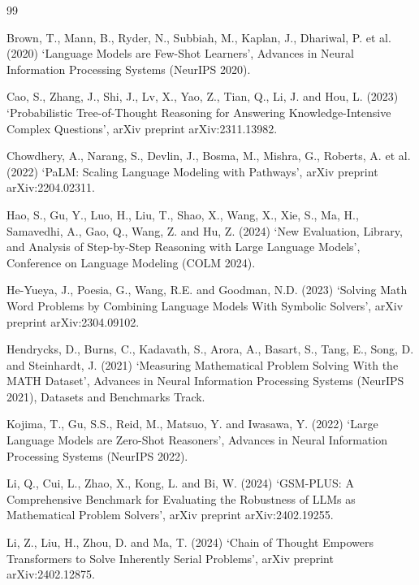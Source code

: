 \documentclass[a4paper,11pt,twoside]{report}
\begin{document}
\newpage
\renewcommand{\bibname}{References}
\begin{thebibliography}{99}

Brown, T., Mann, B., Ryder, N., Subbiah, M., Kaplan, J., Dhariwal, P. et
al. (2020) `Language Models are Few-Shot Learners', Advances in Neural
Information Processing Systems (NeurIPS 2020).

Cao, S., Zhang, J., Shi, J., Lv, X., Yao, Z., Tian, Q., Li, J. and Hou,
L. (2023) `Probabilistic Tree-of-Thought Reasoning for Answering
Knowledge-Intensive Complex Questions', arXiv preprint arXiv:2311.13982.

Chowdhery, A., Narang, S., Devlin, J., Bosma, M., Mishra, G., Roberts,
A. et al. (2022) `PaLM: Scaling Language Modeling with Pathways', arXiv
preprint arXiv:2204.02311.

Hao, S., Gu, Y., Luo, H., Liu, T., Shao, X., Wang, X., Xie, S., Ma, H.,
Samavedhi, A., Gao, Q., Wang, Z. and Hu, Z. (2024) `New Evaluation,
Library, and Analysis of Step-by-Step Reasoning with Large Language
Models', Conference on Language Modeling (COLM 2024).

He-Yueya, J., Poesia, G., Wang, R.E. and Goodman, N.D. (2023) `Solving
Math Word Problems by Combining Language Models With Symbolic Solvers',
arXiv preprint arXiv:2304.09102.

Hendrycks, D., Burns, C., Kadavath, S., Arora, A., Basart, S., Tang, E.,
Song, D. and Steinhardt, J. (2021) `Measuring Mathematical Problem
Solving With the MATH Dataset', Advances in Neural Information
Processing Systems (NeurIPS 2021), Datasets and Benchmarks Track.

Kojima, T., Gu, S.S., Reid, M., Matsuo, Y. and Iwasawa, Y. (2022) `Large
Language Models are Zero-Shot Reasoners', Advances in Neural Information
Processing Systems (NeurIPS 2022).

Li, Q., Cui, L., Zhao, X., Kong, L. and Bi, W. (2024) `GSM-PLUS: A
Comprehensive Benchmark for Evaluating the Robustness of LLMs as
Mathematical Problem Solvers', arXiv preprint arXiv:2402.19255.

Li, Z., Liu, H., Zhou, D. and Ma, T. (2024) `Chain of Thought Empowers
Transformers to Solve Inherently Serial Problems', arXiv preprint
arXiv:2402.12875.


\end{thebibliography}
\end{document}

